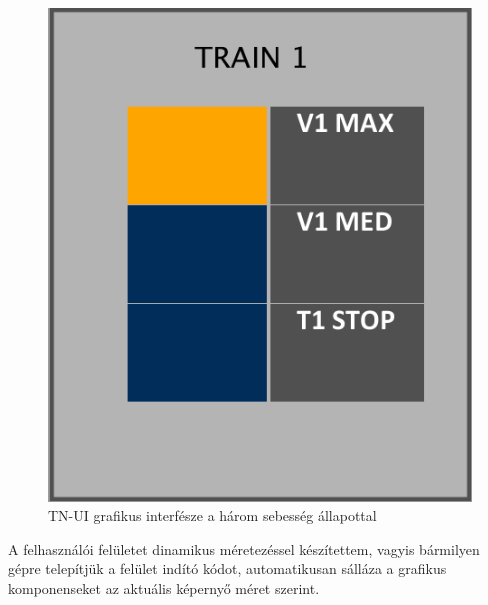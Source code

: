 \documentclass[a4paper,12pt]{article}
\begin{document}
\begin{figure}[htp]
\begin{minipage}{0.3\textwidth}
    \end{minipage}\hfill
    \begin{minipage}{0.3\textwidth}
        \centering
        \includegraphics[width=0.9\linewidth]{images/tn_gui_3.png}
    \end{minipage}
    \caption[TN-UI implementáció]{TN-UI grafikus interfésze a három sebesség állapottal}
    \label{fig:tngui}
\end{figure}

A felhasználói felületet dinamikus méretezéssel készítettem, vagyis bármilyen gépre telepítjük a felület indító kódot, automatikusan sálláza a grafikus komponenseket az aktuális képernyő méret szerint.

\end{document}
